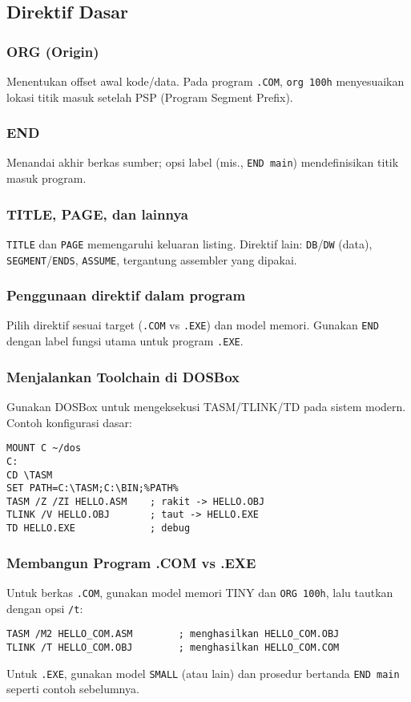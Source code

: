 \subsection{Direktif Dasar}
\subsubsection{ORG (Origin)}
Menentukan offset awal kode/data. Pada program \texttt{.COM}, \texttt{org 100h} menyesuaikan lokasi titik masuk setelah PSP (Program Segment Prefix).

\subsubsection{END}
Menandai akhir berkas sumber; opsi label (mis., \texttt{END main}) mendefinisikan titik masuk program.

\subsubsection{TITLE, PAGE, dan lainnya}
\texttt{TITLE} dan \texttt{PAGE} memengaruhi keluaran listing. Direktif lain: \texttt{DB}/\texttt{DW} (data), \texttt{SEGMENT}/\texttt{ENDS}, \texttt{ASSUME}, tergantung assembler yang dipakai.

\subsubsection{Penggunaan direktif dalam program}
Pilih direktif sesuai target (\texttt{.COM} vs \texttt{.EXE}) dan model memori. Gunakan \texttt{END} dengan label fungsi utama untuk program \texttt{.EXE}.

\subsubsection{Menjalankan Toolchain di DOSBox}
Gunakan DOSBox untuk mengeksekusi TASM/TLINK/TD pada sistem modern. Contoh konfigurasi dasar: \cite{dosbox_manual}
\begin{verbatim}
MOUNT C ~/dos
C:
CD \TASM
SET PATH=C:\TASM;C:\BIN;%PATH%
TASM /Z /ZI HELLO.ASM    ; rakit -> HELLO.OBJ
TLINK /V HELLO.OBJ       ; taut -> HELLO.EXE
TD HELLO.EXE             ; debug
\end{verbatim}

\subsubsection{Membangun Program .COM vs .EXE}
Untuk berkas \texttt{.COM}, gunakan model memori TINY dan \texttt{ORG 100h}, lalu tautkan dengan opsi \texttt{/t}:
\begin{verbatim}
TASM /M2 HELLO_COM.ASM        ; menghasilkan HELLO_COM.OBJ
TLINK /T HELLO_COM.OBJ        ; menghasilkan HELLO_COM.COM
\end{verbatim}
Untuk \texttt{.EXE}, gunakan model \texttt{SMALL} (atau lain) dan prosedur bertanda \texttt{END main} seperti contoh sebelumnya. \cite{borland1990tasm}

